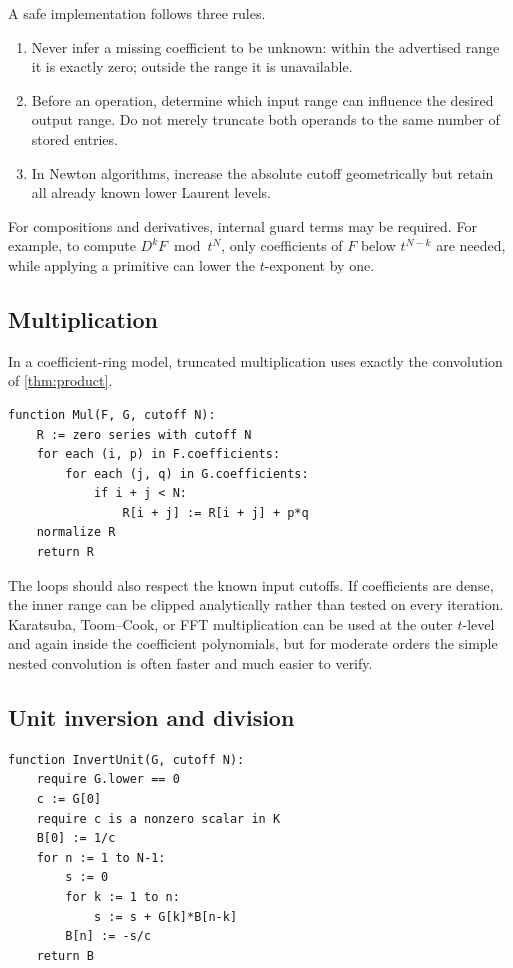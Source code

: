 \documentclass[11pt,oneside]{article}
\numberwithin{equation}{section}
\theoremstyle{definition}
\begin{document}
A safe implementation follows three rules.
\begin{enumerate}
\item Never infer a missing coefficient to be unknown: within the advertised
  range it is exactly zero; outside the range it is unavailable.
\item Before an operation, determine which input range can influence the desired
  output range.  Do not merely truncate both operands to the same number of
  stored entries.
\item In Newton algorithms, increase the absolute cutoff geometrically but
  retain all already known lower Laurent levels.
\end{enumerate}

For compositions and derivatives, internal guard terms may be required.  For
example, to compute \(D^kF\bmod t^N\), only coefficients of \(F\) below
\(t^{N-k}\) are needed, while applying a primitive can lower the \(t\)-exponent
by one.

\subsection{Multiplication}

In a coefficient-ring model, truncated multiplication uses exactly the
convolution of \cref{thm:product}.

\begin{lstlisting}[style=pseudocode,caption={Naive truncated PL multiplication.}]
function Mul(F, G, cutoff N):
    R := zero series with cutoff N
    for each (i, p) in F.coefficients:
        for each (j, q) in G.coefficients:
            if i + j < N:
                R[i + j] := R[i + j] + p*q
    normalize R
    return R
\end{lstlisting}

The loops should also respect the known input cutoffs.  If coefficients are
dense, the inner range can be clipped analytically rather than tested on every
iteration.  Karatsuba, Toom--Cook, or FFT multiplication can be used at the
outer \(t\)-level and again inside the coefficient polynomials, but for moderate
orders the simple nested convolution is often faster and much easier to verify.

\subsection{Unit inversion and division}

\begin{lstlisting}[style=pseudocode,caption={Reciprocal of a PL unit starting at exponent zero.}]
function InvertUnit(G, cutoff N):
    require G.lower == 0
    c := G[0]
    require c is a nonzero scalar in K
    B[0] := 1/c
    for n := 1 to N-1:
        s := 0
        for k := 1 to n:
            s := s + G[k]*B[n-k]
        B[n] := -s/c
    return B
\end{lstlisting}
\end{document}
